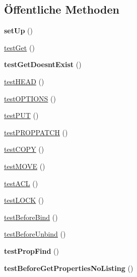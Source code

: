 \subsection*{Öffentliche Methoden}
\begin{DoxyCompactItemize}
\item 
\mbox{\label{class_sabre_1_1_d_a_v_a_c_l_1_1_block_access_test_a909cc2cc33649cd871a8c7d6d5feb8e5}} 
{\bfseries set\+Up} ()
\item 
\mbox{\hyperlink{class_sabre_1_1_d_a_v_a_c_l_1_1_block_access_test_abadc343a63217ca8827555a92cbb4145}{test\+Get}} ()
\item 
\mbox{\label{class_sabre_1_1_d_a_v_a_c_l_1_1_block_access_test_ada6d8f87919e18737d1aaaad325dda40}} 
{\bfseries test\+Get\+Doesnt\+Exist} ()
\item 
\mbox{\hyperlink{class_sabre_1_1_d_a_v_a_c_l_1_1_block_access_test_a17fe0425f33cdbab3f6a129c83f8185f}{test\+H\+E\+AD}} ()
\item 
\mbox{\hyperlink{class_sabre_1_1_d_a_v_a_c_l_1_1_block_access_test_abaf24f3f7981e73edc2de2a61cee6e25}{test\+O\+P\+T\+I\+O\+NS}} ()
\item 
\mbox{\hyperlink{class_sabre_1_1_d_a_v_a_c_l_1_1_block_access_test_a99da6b6eb78a9506ebe1f20580adaea2}{test\+P\+UT}} ()
\item 
\mbox{\hyperlink{class_sabre_1_1_d_a_v_a_c_l_1_1_block_access_test_a8710693dc8e20582e94fc92963954f21}{test\+P\+R\+O\+P\+P\+A\+T\+CH}} ()
\item 
\mbox{\hyperlink{class_sabre_1_1_d_a_v_a_c_l_1_1_block_access_test_a03276d61d84ceab511b47a3bbebe1941}{test\+C\+O\+PY}} ()
\item 
\mbox{\hyperlink{class_sabre_1_1_d_a_v_a_c_l_1_1_block_access_test_ae3df9294e1198ba5edfc508d59316460}{test\+M\+O\+VE}} ()
\item 
\mbox{\hyperlink{class_sabre_1_1_d_a_v_a_c_l_1_1_block_access_test_ac1b7196f53f5b0bc7bc41efb0ded5465}{test\+A\+CL}} ()
\item 
\mbox{\hyperlink{class_sabre_1_1_d_a_v_a_c_l_1_1_block_access_test_a1545266562e51298c9284a567abb7e8d}{test\+L\+O\+CK}} ()
\item 
\mbox{\hyperlink{class_sabre_1_1_d_a_v_a_c_l_1_1_block_access_test_aed224829f3f3a4ef9f76c709b8536049}{test\+Before\+Bind}} ()
\item 
\mbox{\hyperlink{class_sabre_1_1_d_a_v_a_c_l_1_1_block_access_test_ae2677e350a2fd41f36fb6652127fcb6c}{test\+Before\+Unbind}} ()
\item 
\mbox{\label{class_sabre_1_1_d_a_v_a_c_l_1_1_block_access_test_a12a71f8dfb1727a515d527b21797f8da}} 
{\bfseries test\+Prop\+Find} ()
\item 
\mbox{\label{class_sabre_1_1_d_a_v_a_c_l_1_1_block_access_test_a67b184f2f78e4b51be9469af6babcba6}} 
{\bfseries test\+Before\+Get\+Properties\+No\+Listing} ()
\end{DoxyCompactItemize}
